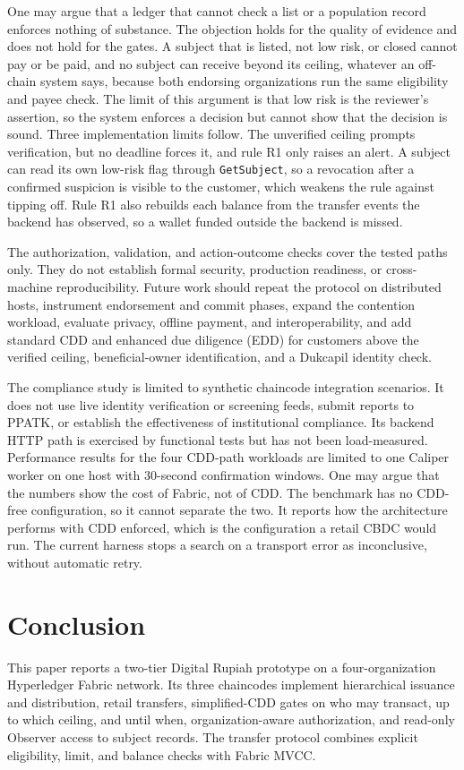 \documentclass[conference]{IEEEtran}
\begin{document}
One may argue that a ledger that cannot check a list or a population record enforces
nothing of substance. The objection holds for the quality of evidence and does not
hold for the gates. A subject that is listed, not low risk, or closed cannot pay or be
paid, and no subject can receive beyond its ceiling, whatever an off-chain system
says, because both endorsing organizations run the same eligibility and payee check.
The limit of this argument is that low risk is the reviewer's assertion, so the
system enforces a decision but cannot show that the decision is sound. Three
implementation limits follow. The unverified ceiling prompts verification, but no
deadline forces it, and rule R1 only raises an alert. A subject can read its own
low-risk flag through \texttt{GetSubject}, so a revocation after a confirmed
suspicion is visible to the customer, which weakens the rule against tipping off.
Rule R1 also rebuilds each balance from the transfer events the backend has
observed, so a wallet funded outside the backend is missed.

The authorization, validation, and action-outcome checks cover the tested paths
only. They do not establish formal security, production readiness, or
cross-machine reproducibility. Future work should repeat the protocol on
distributed hosts, instrument endorsement and commit phases, expand the
contention workload, evaluate privacy, offline payment, and interoperability, and add
standard CDD and enhanced due diligence (EDD) for customers above the verified
ceiling, beneficial-owner identification, and a Dukcapil identity check.

The compliance study is limited to synthetic chaincode integration scenarios. It
does not use live identity verification or screening feeds, submit reports to
PPATK, or establish the effectiveness of institutional compliance.
Its backend HTTP path is exercised by functional tests but has not been
load-measured. Performance results for the four CDD-path workloads are limited to one
Caliper worker on one host with 30-second confirmation windows. One may argue that
the numbers show the cost of Fabric, not of CDD. The benchmark has no CDD-free
configuration, so it cannot separate the two. It reports how the architecture
performs with CDD enforced, which is the configuration a retail CBDC would run. The current harness
stops a search on a transport error as inconclusive, without automatic retry.

\section{Conclusion}
This paper reports a two-tier Digital Rupiah prototype on a four-organization
Hyperledger Fabric network. Its three chaincodes implement hierarchical issuance and
distribution, retail transfers, simplified-CDD gates on who may transact, up to which ceiling,
and until when, organization-aware authorization, and read-only
Observer access to subject records. The transfer protocol combines explicit
eligibility, limit, and balance checks with Fabric MVCC.
\end{document}
